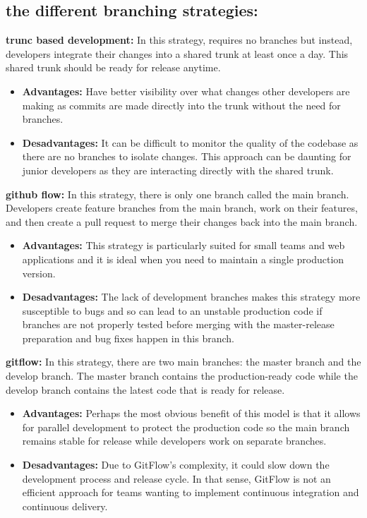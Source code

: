 \subsection*{the different branching strategies\cite{webArticle3}:}
\textbf{trunc based development:} In this strategy, requires no branches but instead, developers integrate their changes into a shared trunk at least once a day. This shared trunk should be ready for release anytime.
\begin{itemize}
    \item \textbf{Advantages:} Have better visibility over what changes other developers are making as commits are made directly into the trunk without the need for branches.
    \item \textbf{Desadvantages:} It can be difficult to monitor the quality of the codebase as there are no branches to isolate changes. This approach can be daunting for junior developers as they are interacting directly with the shared trunk.
\end{itemize}
\par
\textbf{github flow:} In this strategy, there is only one branch called the main branch. Developers create feature branches from the main branch, work on their features, and then create a pull request to merge their changes back into the main branch.
\begin{itemize}
    \item \textbf{Advantages:} This strategy is particularly suited for small teams and web applications and it is ideal when you need to maintain a single production version.
    \item \textbf{Desadvantages:} The lack of development branches makes this strategy more susceptible to bugs and so can lead to an unstable production code if branches are not properly tested before merging with the master-release preparation and bug fixes happen in this branch.
\end{itemize}
\par
\textbf{gitflow:} In this strategy, there are two main branches: the master branch and the develop branch. The master branch contains the production-ready code while the develop branch contains the latest code that is ready for release.
\begin{itemize}
    \item \textbf{Advantages:} Perhaps the most obvious benefit of this model is that it allows for parallel development to protect the production code so the main branch remains stable for release while developers work on separate branches.
    \item \textbf{Desadvantages:} Due to GitFlow's complexity, it could slow down the development process and release cycle. In that sense, GitFlow is not an efficient approach for teams wanting to implement continuous integration and continuous delivery.
\end{itemize}

